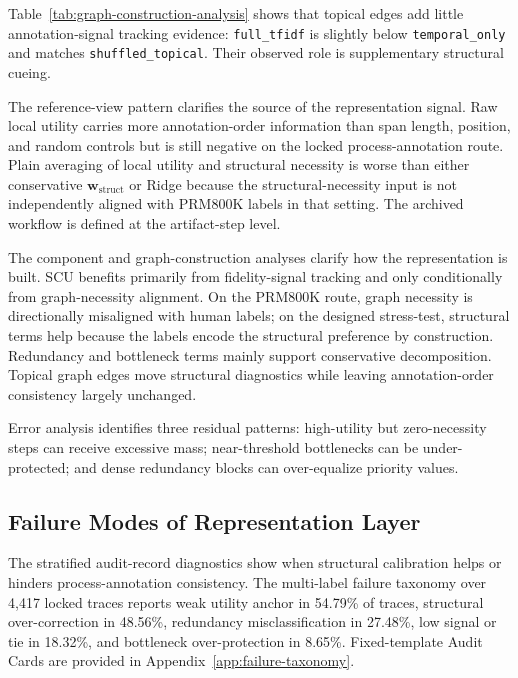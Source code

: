 \documentclass[a4paper,fleqn]{cas-sc}
\newcommand{\wstruct}{\ensuremath{\mathbf{w}_{\mathrm{struct}}}}
\begin{document}
Table~\ref{tab:graph-construction-analysis} shows that topical edges add little annotation-signal tracking evidence: \texttt{full\_tfidf} is slightly below \texttt{temporal\_only} and matches \texttt{shuffled\_topical}. Their observed role is supplementary structural cueing.

The reference-view pattern clarifies the source of the representation signal. Raw local utility carries more annotation-order information than span length, position, and random controls but is still negative on the locked process-annotation route. Plain averaging of local utility and structural necessity is worse than either conservative \wstruct{} or Ridge because the structural-necessity input is not independently aligned with PRM800K labels in that setting. The archived workflow is defined at the artifact-step level.

The component and graph-construction analyses clarify how the representation is built. SCU benefits primarily from fidelity-signal tracking and only conditionally from graph-necessity alignment. On the PRM800K route, graph necessity is directionally misaligned with human labels; on the designed stress-test, structural terms help because the labels encode the structural preference by construction. Redundancy and bottleneck terms mainly support conservative decomposition. Topical graph edges move structural diagnostics while leaving annotation-order consistency largely unchanged.

Error analysis identifies three residual patterns: high-utility but zero-necessity steps can receive excessive mass; near-threshold bottlenecks can be under-protected; and dense redundancy blocks can over-equalize priority values.

\subsection{Failure Modes of Representation Layer}
\label{sec:prm800k-error}

The stratified audit-record diagnostics show when structural calibration helps or hinders process-annotation consistency. The multi-label failure taxonomy over 4,417 locked traces reports weak utility anchor in 54.79\% of traces, structural over-correction in 48.56\%, redundancy misclassification in 27.48\%, low signal or tie in 18.32\%, and bottleneck over-protection in 8.65\%. Fixed-template Audit Cards are provided in Appendix~\ref{app:failure-taxonomy}.
\end{document}
